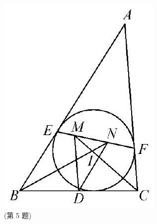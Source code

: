 \documentclass[10pt]{article}
\begin{document}
\includegraphics[max width=\textwidth, center]{2024_10_30_66b8e5e701da2093c133g-050}\\
(第 5 题)
\end{document}
